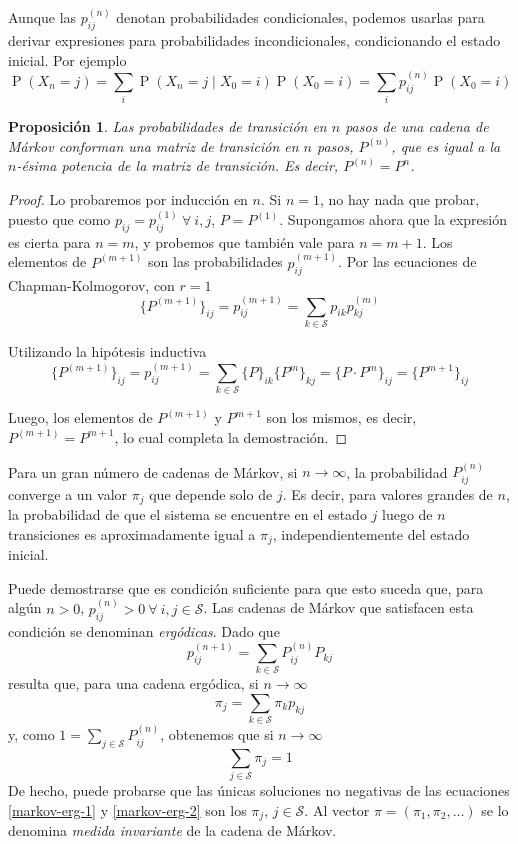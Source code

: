 \documentclass[11pt]{article}
\theoremstyle{plain}
\newtheorem*{pro}{Proposición}
\theoremstyle{definition}
\theoremstyle{remark}
\newcommand{\proba}{\ensuremath{\operatorname{P}}}  %
\newcommand{\espm}[0]{\ensuremath{\mathcal{S}}}  %
\newcommand{\foralle}{\ensuremath{\forall \ }}  %
\begin{document}
    Aunque las $p_{ij}^{(n)}$ denotan probabilidades condicionales, podemos usarlas para derivar expresiones para probabilidades incondicionales, condicionando el estado inicial. Por ejemplo
    \[ \proba(X_n = j) = \sum_i \proba(X_n = j \mid X_0 = i) \proba(X_0 = i) = \sum_i p_{ij}^{(n)} \proba(X_0 = i) \]

    \begin{pro}
      Las probabilidades de transición en $n$ pasos de una cadena de Márkov conforman una \emph{matriz de transición en $n$ pasos}, $P^{(n)}$, que es igual a la $n$-ésima potencia de la matriz de transición. Es decir, $P^{(n)} = P^n$.
    \end{pro}
    \begin{proof}
      Lo probaremos por inducción en $n$. Si $n = 1$, no hay nada que probar, puesto que como $p_{ij} = p^{(1)}_{ij} \ \foralle i, j$, $P = P^{(1)}$. Supongamos ahora que la expresión es cierta para $n = m$, y probemos que también vale para $n = m + 1$.
      Los elementos de $P^{(m + 1)}$ son las probabilidades $p_{ij}^{(m + 1)}$. Por las ecuaciones de Chapman-Kolmogorov, con $r = 1$
      \[ \lbrace P^{(m + 1)} \rbrace_{ij} = p_{ij}^{(m + 1)} = \sum_{k \in \espm} p_{ik} p_{kj}^{(m)} \]

      Utilizando la hipótesis inductiva
      \[ \lbrace P^{(m + 1)} \rbrace_{ij} = p_{ij}^{(m + 1)} = \sum_{k \in \espm} \lbrace P \rbrace_{ik} \lbrace P^m \rbrace_{kj} = \lbrace P \cdot P^m \rbrace_{ij} = \lbrace P^{m + 1} \rbrace_{ij} \]

      Luego, los elementos de $P^{(m + 1)}$ y $P^{m + 1}$ son los mismos, es decir, $P^{(m + 1)} = P^{m + 1}$, lo cual completa la demostración.
    \end{proof}

    Para un gran número de cadenas de Márkov, si $n \to \infty$, la probabilidad $P_{ij}^{(n)}$ converge a un valor $\pi_j$ que depende solo de $j$. Es decir, para valores grandes de $n$, la probabilidad de que el sistema se encuentre en el estado $j$ luego de $n$ transiciones es aproximadamente igual a $\pi_j$, independientemente del estado inicial.

    Puede demostrarse que es condición suficiente para que esto suceda que, para algún $n > 0$, $p_{ij}^{(n)} > 0 \ \foralle i, j \in \espm$. Las cadenas de Márkov que satisfacen esta condición se denominan \emph{ergódicas}. Dado que
    \[ p_{ij}^{(n+1)} = \sum_{k \in \espm} P_{ij}^{(n)} P_{kj} \]
    resulta que, para una cadena ergódica, si $n \to \infty$
    \begin{equation} \label{markov-erg-1} \pi_j = \sum_{k \in \espm} \pi_k p_{kj} \end{equation}
    y, como $1 = \sum_{j \in \espm} P_{ij}^{(n)}$, obtenemos que si $n \to \infty$
    \begin{equation} \label{markov-erg-2} \sum_{j \in \espm} \pi_j = 1 \end{equation}
    De hecho, puede probarse que las únicas soluciones no negativas de las ecuaciones \eqref{markov-erg-1} y \eqref{markov-erg-2} son los $\pi_j$, $j \in \espm$. Al vector $\pi = (\pi_1, \pi_2, \dots)$ se lo denomina \emph{medida invariante} de la cadena de Márkov.
\end{document}
